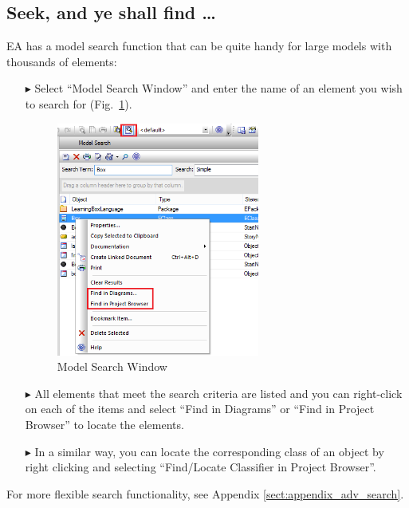 \subsection{Seek, and ye shall find \ldots}
EA has a model search function that can be quite handy for large models with thousands of elements:

\begin{enumerate}
\item[$\blacktriangleright$]Select ``Model Search Window'' and enter the name of an element you wish to search for (Fig.~\ref{fig_search01}).
\begin{figure}[htbp]
\begin{center}
  \includegraphics[width=0.63\textwidth]{search1}
  \caption{Model Search Window}  
  \label{fig_search01}
\end{center}
\end{figure}

\item[$\blacktriangleright$] All elements that meet the search criteria are listed and you can right-click on each of the items and select ``Find in Diagrams''
or  ``Find in Project Browser'' to locate the elements.

\item[$\blacktriangleright$] In a similar way, you can locate the corresponding class of an object by right clicking and selecting ``Find/Locate Classifier in
Project Browser''.
\end{enumerate}

For more flexible search functionality, see Appendix \ref{sect:appendix_adv_search}.
